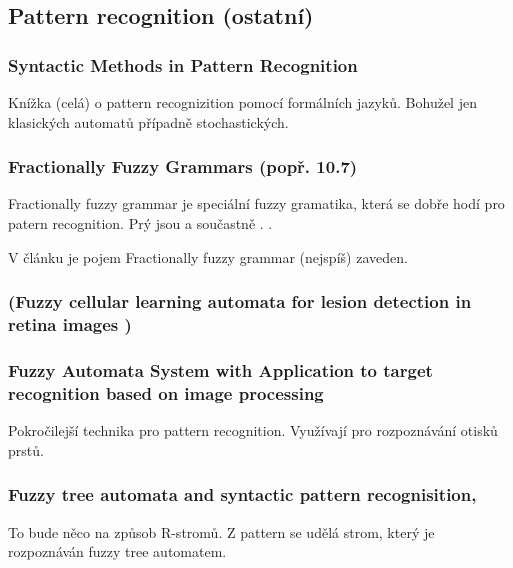\documentclass[a4paper,10pt]{article}
\begin{document}
\subsection{Pattern recognition (ostatní)}




\subsubsection*{Syntactic Methods in Pattern Recognition \cite{Fu-SynMethPattRec}}

Knížka (celá) o pattern recognizition pomocí formálních jazyků. Bohužel jen klasických automatů případně stochastických.


\subsubsection*{Fractionally Fuzzy Grammars \cite{PalYau-FracFuzzGramAppPatRec} (popř. \cite{MorMal-FuzzAutAndLangs} 10.7)}

Fractionally fuzzy grammar je speciální fuzzy gramatika, která se dobře hodí pro patern recognition. Prý jsou  a součastně . .

V článku \cite{PalYau-FracFuzzGramAppPatRec} je pojem Fractionally fuzzy grammar (nejspíš) zaveden.

\subsubsection*{(Fuzzy cellular learning automata for lesion detection in retina images \cite{NejAzaAdeMohMir-FuzzCellLeaAutLesDetRetIma})}

\subsubsection*{Fuzzy Automata System with Application to target recognition based on image processing \cite{WuaPanHan-FuzzAutSysAppTarRecBasImaProc}}

Pokročilejší technika pro pattern recognition. Využívají pro rozpoznávání otisků prstů.



\subsubsection*{Fuzzy tree automata and syntactic pattern recognisition\cite{Lee-FuzzTreeAutSyntPattRec}, \cite{MogZadAme-NewDirInFuzzTreeAut}}
To bude něco na způsob R-stromů. Z pattern se udělá strom, který je rozpoznáván fuzzy tree automatem.
\end{document}
